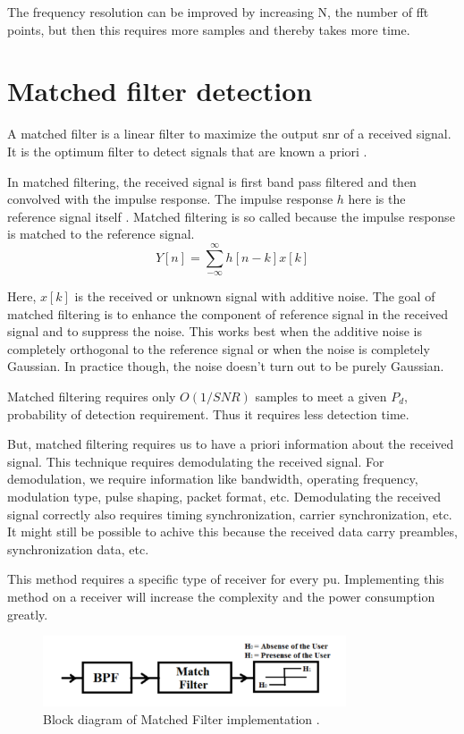 The frequency resolution can be improved by increasing N, the number of \gls{fft}  
points, but then this requires more samples and thereby takes more time.

\section{Matched filter detection}
A matched filter is a linear filter to maximize the output \gls{snr}  of a received 
signal. It is the optimum filter to detect signals that are known a priori 
\cite{wikiMF}.


In matched filtering, the received signal is first band pass filtered and then
convolved with the impulse response. The impulse response $h$ here is the 
reference signal itself \cite{bhatta11}. Matched filtering is so called 
because the impulse response is matched to the reference signal.
\begin{equation*}
    Y[n] = \sum_{-\infty}^{\infty} h[n-k]x[k]
\end{equation*}

Here, $x[k]$ is the received or unknown signal with additive noise.
The goal of matched filtering is to enhance the component of reference signal
in the received signal and to suppress the noise. This works best when the 
additive noise is completely orthogonal to the reference signal or when the
noise is completely Gaussian. In practice though, the noise doesn't turn out 
to be purely Gaussian.
 
Matched filtering requires only $O(1/SNR)$ samples to meet a given $P_d$, 
probability of detection requirement. Thus it requires less detection time.

But, matched filtering requires us to have a priori information about the 
received signal. This technique requires demodulating the received signal. For
demodulation, we require information like bandwidth, operating frequency, 
modulation type, pulse shaping, packet format, etc. Demodulating the received
signal correctly also requires timing synchronization, carrier 
synchronization, etc. It might still be possible to achive this because the
received data carry preambles, synchronization data, etc.

This method requires a specific type of receiver for every \gls{pu}.
Implementing this method on a receiver will increase the complexity and the 
power consumption greatly.

\begin{figure}
\centering
\includegraphics[width=0.8\textwidth]{../images/matchedFilter}
\caption[Matched Filter block diagram]{Block diagram of Matched Filter
implementation {\cite{kranthi13}}.}
\label{matchedFilter}
\end{figure}


